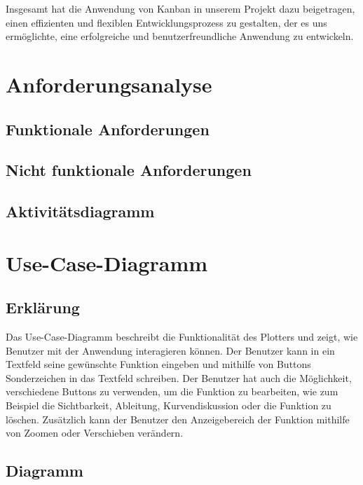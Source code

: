 \documentclass[a4paper]{article}
\begin{document}
\newpage

Insgesamt hat die Anwendung von Kanban in unserem Projekt dazu beigetragen, einen effizienten und flexiblen Entwicklungsprozess zu gestalten, der es uns ermöglichte, eine erfolgreiche und benutzerfreundliche Anwendung zu entwickeln.

\section{Anforderungsanalyse}

\subsection{Funktionale Anforderungen}

\subsection{Nicht funktionale Anforderungen}

\subsection{Aktivitätsdiagramm}

\newpage

\section{Use-Case-Diagramm}

\subsection{Erklärung}

Das Use-Case-Diagramm beschreibt die Funktionalität des Plotters und zeigt, wie Benutzer mit der Anwendung interagieren können. Der Benutzer kann in ein Textfeld seine gewünschte Funktion eingeben und mithilfe von Buttons Sonderzeichen in das Textfeld schreiben. Der Benutzer hat auch die Möglichkeit, verschiedene Buttons zu verwenden, um die Funktion zu bearbeiten, wie zum Beispiel die Sichtbarkeit, Ableitung, Kurvendiskussion oder die Funktion zu löschen. Zusätzlich kann der Benutzer den Anzeigebereich der Funktion mithilfe von Zoomen oder Verschieben verändern.

\subsection{Diagramm}
\end{document}
